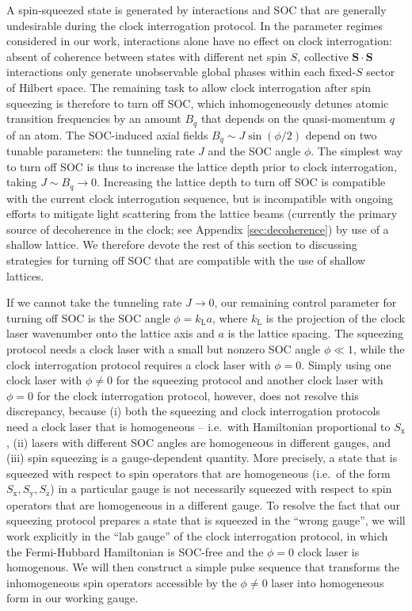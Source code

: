 \documentclass[aps,prx,superscriptaddress,twocolumn]{revtex4-2}
\renewcommand{\t}{\text} %
\renewcommand{\c}{\cdot} %
\renewcommand{\v}{\bm} %
\newcommand{\z}{\text{z}}
\newcommand{\x}{\text{x}}
\newcommand{\y}{\text{y}}
\begin{document}
A spin-squeezed state is generated by interactions and SOC that are generally undesirable during the clock interrogation protocol.
In the parameter regimes considered in our work, interactions alone have no effect on clock interrogation: absent of coherence between states with different net spin $S$, collective $\v S\c\v S$ interactions only generate unobservable global phases within each fixed-$S$ sector of Hilbert space.
The remaining task to allow clock interrogation after spin squeezing is therefore to turn off SOC, which inhomogeneously detunes atomic transition frequencies by an amount $B_q$ that depends on the quasi-momentum $q$ of an atom.
The SOC-induced axial fields $B_q\sim J\sin(\phi/2)$ depend on two tunable parameters: the tunneling rate $J$ and the SOC angle $\phi$.
The simplest way to turn off SOC is thus to increase the lattice depth prior to clock interrogation, taking $J\sim B_q\to0$.
Increasing the lattice depth to turn off SOC is compatible with the current clock interrogation sequence, but is incompatible with ongoing efforts to mitigate light scattering from the lattice beams (currently the primary source of decoherence in the clock; see Appendix \ref{sec:decoherence}) by use of a shallow lattice\cite{hutson2019engineering}.
We therefore devote the rest of this section to discussing strategies for turning off SOC that are compatible with the use of shallow lattices.

If we cannot take the tunneling rate $J\to0$, our remaining control parameter for turning off SOC is the SOC angle $\phi=k_{\t{L}}a$, where $k_{\t{L}}$ is the projection of the clock laser wavenumber onto the lattice axis and $a$ is the lattice spacing.
The squeezing protocol needs a clock laser with a small but nonzero SOC angle $\phi\ll1$, while the clock interrogation protocol requires a clock laser with $\phi=0$.
Simply using one clock laser with $\phi\ne0$ for the squeezing protocol and another clock laser with $\phi=0$ for the clock interrogation protocol, however, does not resolve this discrepancy, because (i) both the squeezing and clock interrogation protocols need a clock laser that is homogeneous -- i.e.~with Hamiltonian proportional to $S_\x$, (ii) lasers with different SOC angles are homogeneous in different gauges, and (iii) spin squeezing is a gauge-dependent quantity.
More precisely, a state that is squeezed with respect to spin operators that are homogeneous (i.e.~of the form $S_\x,S_\y,S_\z$) in a particular gauge is not necessarily squeezed with respect to spin operators that are homogeneous in a different gauge.
To resolve the fact that our squeezing protocol prepares a state that is squeezed in the ``wrong gauge'', we will work explicitly in the ``lab gauge'' of the clock interrogation protocol, in which the Fermi-Hubbard Hamiltonian is SOC-free and the $\phi=0$ clock laser is homogenous.
We will then construct a simple pulse sequence that transforms the inhomogeneous spin operators accessible by the $\phi\ne0$ laser into homogeneous form in our working gauge.
\end{document}
